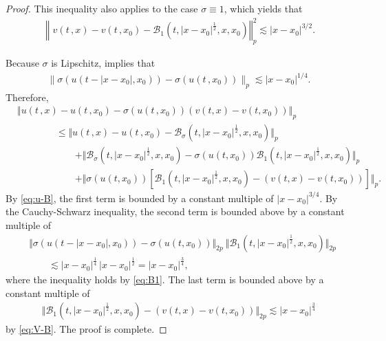 \documentclass[12pt,a4paper]{article}
\newcommand{\cB}{{\mathcal{B}}}
\renewcommand{\d}{\mathrm{d}}
\newcommand {\half}{\frac 12}
\newcommand{\<}{\langle}
\renewcommand{\>}{\rangle}
\begin{document}
\begin{proof}
           This inequality also applies to the case $\sigma\equiv 1$, which yields that
\begin{align}\label{eq:V-B}
            \left\|v(t\,,x)- v(t\,,x_0)  - \cB_1(t, |x-x_0|^\half, x, x_0) \right\Vert_p^2 
             \lesssim |x-x_0|^{3/2}.
\end{align}


Because $\sigma$ is Lipschitz, \cite[Theorem 4.3.4]{dss} implies that
\begin{align*}
           \|\sigma(u(t-|x-x_0|, x_0))- \sigma(u(t\,,x_0))\|_p \lesssim |x-x_0|^{1/4}.
 \end{align*}
Therefore,
\begin{align*}
    &  \left\Vert u(t\,,x)- u(t\,, x_0)-\sigma(u(t\,,x_0))(v(t,x)-v(t,x_0)) \right\Vert_p \\
       &\qquad\qquad \leq \Vert u(t\,,x)- u(t\,,x_0) - \mathcal{B}_\sigma(t,|x-x_0|^\half, x, x_0)\Vert_p \\
        &\qquad \qquad\qquad +  \Vert \mathcal{B}_\sigma(t,|x-x_0|^\half, x, x_0) - \sigma(u(t, x_0)) \cB_1(t,|x-x_0|^\half, x, x_0)\Vert_p \\
         &\qquad \qquad\qquad+   \Vert  \sigma(u(t, x_0)) [\cB_1(t,|x-x_0|^\half, x, x_0) - (v(t,x)-v(t,x_0))] \Vert_p.
\end{align*}
By \eqref{eq:u-B}, the first term is bounded by a constant multiple of $|x-x_0|^{3/4}$. By the Cauchy-Schwarz inequality, the second term is bounded above by a constant multiple of 
\begin{align*}
     & \Vert \sigma(u(t - |x-x_0|, x_0))   - \sigma(u(t, x_0)) \Vert_{2p}\ \Vert \cB_1(t,|x-x_0|^\half, x, x_0)\Vert_{2p} \\
     &\qquad \lesssim |x-x_0|^{\frac{1}{4}}\, |x-x_0|^{\frac12} = |x-x_0|^{\frac{3}{4}},
\end{align*}
where the inequality holds by \eqref{eq:B1}.
The last term is bounded above by a constant multiple of 
\begin{align*}
    \Vert \cB_1(t,|x-x_0|^\half, x, x_0) - (v(t,x)-v(t,x_0)) \Vert_{2p} \lesssim |x-x_0|^{\frac{3}{4}}
\end{align*}
by \eqref{eq:V-B}.
The proof is complete.                
 \end{proof}
 
\end{document}
